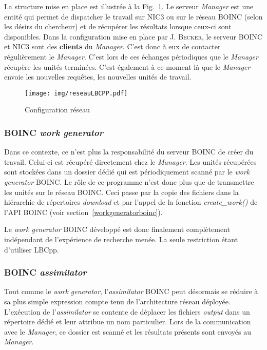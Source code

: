 \documentclass[a4paper, 12pt]{report}
\begin{document}
La structure mise en place est illustrée à la Fig.~\ref{reseauLBCPP}. Le serveur \textit{Manager} est une entité qui permet de dispatcher le travail sur NIC3 ou sur le réseau \textsc{BOINC} (selon les désirs du chercheur) et de récupérer les résultats lorsque ceux-ci sont disponibles. Dans la configuration mise en place par J. \textsc{Becker}, le serveur \textsc{BOINC} et NIC3 sont des \textbf{clients} du \textit{Manager}. C'est donc à eux de contacter régulièrement le \textit{Manager}. C'est lors de ces échanges périodiques que le \textit{Manager} récupère les unités terminées. C'est également à ce moment là que le \textit{Manager} envoie les nouvelles requêtes, les nouvelles unités de travail.

\begin{figure}[!tb]
\centering
\texttt{[image: img/reseauLBCPP.pdf]}	
\caption{Configuration réseau}
\label{reseauLBCPP}
\end{figure}


\subsubsection{\textsc{BOINC} \textit{work generator}}
Dans ce contexte, ce n'est plus la responsabilité du serveur \textsc{BOINC} de créer du travail. Celui-ci est récupéré directement chez le \textit{Manager}. Les unités récupérées sont stockées dans un dossier dédié qui est périodiquement scanné par le \textit{work generator} \textsc{BOINC}. Le rôle de ce programme n'est donc plus que de transmettre les unités sur le réseau \textsc{BOINC}. Ceci passe par la copie des fichiers dans la hiérarchie de répertoires \textit{download} et par l'appel de la fonction \textit{create\_work()} de l'API \textsc{BOINC} (voir section~\ref{workgeneratorboinc}). 

Le \textit{work generator} \textsc{BOINC} développé est donc finalement complètement indépendant de l'expérience de recherche menée. La seule restriction étant d'utiliser LBCpp.


\subsubsection{\textsc{BOINC} \textit{assimilator}}
Tout comme le \textit{work generator}, l'\textit{assimilator} \textsc{BOINC} peut désormais se réduire à sa plus simple expression compte tenu de l'architecture réseau déployée. L'exécution de l'\textit{assimilator} se contente de déplacer les fichiers \textit{output} dans un répertoire dédié et leur attribue un nom particulier. Lors de la communication avec le \textit{Manager}, ce dossier est scanné et les résultats présents sont envoyés au \textit{Manager}.
\end{document}
